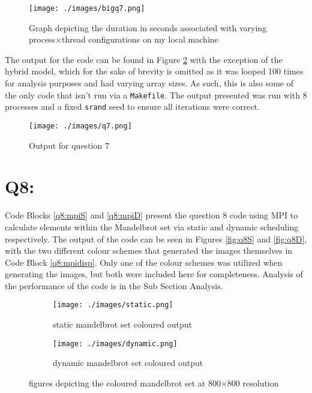 \documentclass[11pt]{article}
\begin{document}
\begin{figure}[H]
\centering
    \texttt{[image: ./images/bigq7.png]}
\caption{Graph depicting the duration in seconds associated with varying process$\times$thread configurations on my local machine}
\label{fig:bigq7}
\end{figure}

The output for the code can be found in Figure \ref{fig:q7} with the exception of the hybrid model, which for the sake of brevity is omitted as it was looped 100 times for analysis purposes and had varying array sizes.
As such, this is also some of the only code that isn't run via a \texttt{Makefile}.
The output presented was run with 8 processes and a fixed \texttt{srand} seed to ensure all iterations were correct.
\begin{figure}[H]
\centering
    \texttt{[image: ./images/q7.png]}
\caption{Output for question 7}
\label{fig:q7}
\end{figure}

\newpage
\section*{Q8:}

Code Blocks \ref{q8:mpiS} and \ref{q8:mpiD} present the question 8 code using MPI to calculate elements within the Mandelbrot set via static and dynamic scheduling respectively.
The output of the code can be seen in Figures \ref{fig:q8S} and \ref{fig:q8D}, with the two different colour schemes that generated the images themselves in Code Block \ref{q8:mpidisp}.
Only one of the colour schemes was utilized when generating the images, but both were included here for completeness.
Analysis of the performance of the code is in the Sub Section Analysis.





\begin{figure}
\centering
\begin{subfigure}[t]{0.48\textwidth}
  \centering
    \texttt{[image: ./images/static.png]}
  \caption{static mandelbrot set coloured output}\label{fig:q8s}
\end{subfigure}%
\hfill
\begin{subfigure}[t]{0.48\textwidth}
  \centering
    \texttt{[image: ./images/dynamic.png]}
  \caption{dynamic mandelbrot set coloured output}\label{fig:q8d}
\end{subfigure}%
\caption{figures depicting the coloured mandelbrot set at 800$\times$800 resolution}
\label{fig:outq8}
\end{figure}
\end{document}
